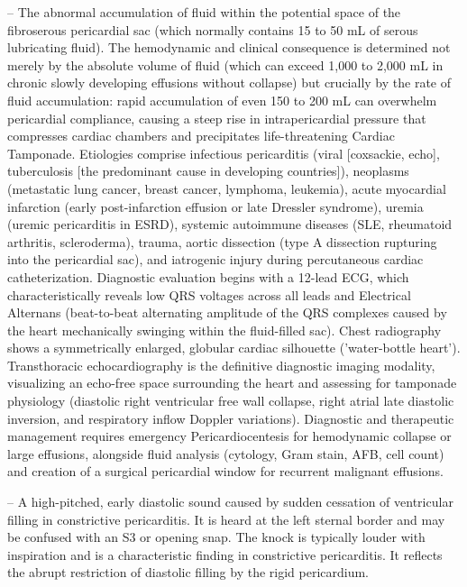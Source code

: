 -- The abnormal accumulation of fluid within the potential space of the fibroserous pericardial sac (which normally contains 15 to 50 mL of serous lubricating fluid). The hemodynamic and clinical consequence is determined not merely by the absolute volume of fluid (which can exceed 1,000 to 2,000 mL in chronic slowly developing effusions without collapse) but crucially by the rate of fluid accumulation: rapid accumulation of even 150 to 200 mL can overwhelm pericardial compliance, causing a steep rise in intrapericardial pressure that compresses cardiac chambers and precipitates life-threatening Cardiac Tamponade. Etiologies comprise infectious pericarditis (viral [coxsackie, echo], tuberculosis [the predominant cause in developing countries]), neoplasms (metastatic lung cancer, breast cancer, lymphoma, leukemia), acute myocardial infarction (early post-infarction effusion or late Dressler syndrome), uremia (uremic pericarditis in ESRD), systemic autoimmune diseases (SLE, rheumatoid arthritis, scleroderma), trauma, aortic dissection (type A dissection rupturing into the pericardial sac), and iatrogenic injury during percutaneous cardiac catheterization. Diagnostic evaluation begins with a 12-lead ECG, which characteristically reveals low QRS voltages across all leads and Electrical Alternans (beat-to-beat alternating amplitude of the QRS complexes caused by the heart mechanically swinging within the fluid-filled sac). Chest radiography shows a symmetrically enlarged, globular cardiac silhouette ('water-bottle heart'). Transthoracic echocardiography is the definitive diagnostic imaging modality, visualizing an echo-free space surrounding the heart and assessing for tamponade physiology (diastolic right ventricular free wall collapse, right atrial late diastolic inversion, and respiratory inflow Doppler variations). Diagnostic and therapeutic management requires emergency Pericardiocentesis for hemodynamic collapse or large effusions, alongside fluid analysis (cytology, Gram stain, AFB, cell count) and creation of a surgical pericardial window for recurrent malignant effusions.

-- A high-pitched, early diastolic sound caused by sudden cessation of ventricular filling in constrictive pericarditis. It is heard at the left sternal border and may be confused with an S3 or opening snap. The knock is typically louder with inspiration and is a characteristic finding in constrictive pericarditis. It reflects the abrupt restriction of diastolic filling by the rigid pericardium.

